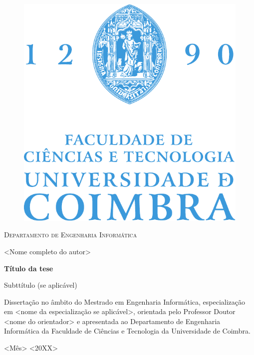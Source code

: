 \thispagestyle{empty}
\mbox{}
\vspace{1cm}

\begin{center}

\begin{figure}[h!]
	\begin{center}
	\includegraphics[width=0.35\linewidth]{frontmatter/FCTUC_logo.pdf}
	\end{center}
\end{figure}

\small
\textsc{Departamento de Engenharia Informática}


\vspace{1.5cm}


\Large
<Nome completo do autor>

\vspace{2cm}

\Huge
\textbf{\textsf{Título da tese}}

\LARGE
\textsf{Subttítulo (se aplicável)}

\vspace{3cm}

\normalsize

Dissertação no âmbito do Mestrado em Engenharia Informática, especialização em <nome da especialização se aplicável>, orientada pelo Professor Doutor <nome do orientador> e apresentada ao Departamento de Engenharia Informática da Faculdade de Ciências e Tecnologia da Universidade de Coimbra.

\vspace{1.5cm}

<Mês> <20XX>



\end{center}







